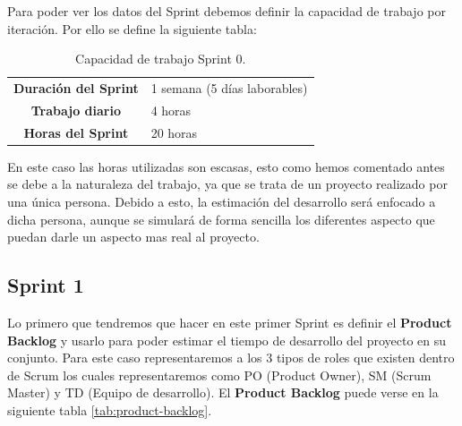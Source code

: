 Para poder ver los datos del Sprint debemos definir la capacidad de trabajo por iteración. Por ello se define la siguiente tabla:

\begin{table}[H]
	\begin{center}
		\begin{tabular}{| c | p{9cm} |}
			\hline
			
			\textbf{Duración del Sprint} & 1 semana (5 días laborables) \\
			\textbf{Trabajo diario} & 4 horas \\
			\textbf{Horas del Sprint} & 20 horas \\ \hline
		\end{tabular}
		\caption{Capacidad de trabajo Sprint 0.}
	\end{center}
\end{table}

En este caso las horas utilizadas son escasas, esto como hemos comentado antes se debe a la naturaleza del trabajo, ya que se trata de un proyecto realizado por una única persona. Debido a esto, la estimación del desarrollo será enfocado a dicha persona, aunque se simulará de forma sencilla los diferentes aspecto que puedan darle un aspecto mas real al proyecto.

\subsection{Sprint 1}

Lo primero que tendremos que hacer en este primer Sprint es definir el \textbf{Product Backlog} y usarlo para poder estimar el tiempo de desarrollo del proyecto en su conjunto. Para este caso representaremos a los 3 tipos de roles que existen dentro de Scrum los cuales representaremos como PO (Product Owner), SM (Scrum Master) y TD (Equipo de desarrollo). El \textbf{Product Backlog} puede verse en la siguiente tabla \ref{tab:product-backlog}.

